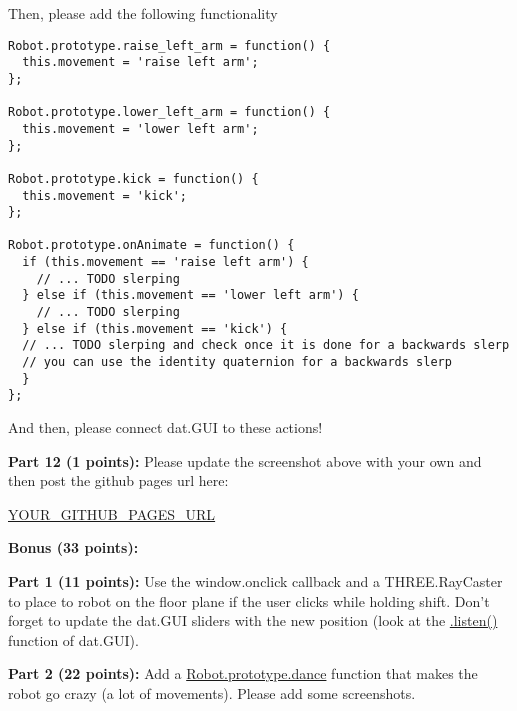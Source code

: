 \documentclass[10pt,oneside,onecolumn,letterpaper]{article}
\begin{document}
\noindent Then, please add the following functionality

\begin{verbatim}
Robot.prototype.raise_left_arm = function() {
  this.movement = 'raise left arm';
};

Robot.prototype.lower_left_arm = function() {
  this.movement = 'lower left arm';
};

Robot.prototype.kick = function() {
  this.movement = 'kick';
};

Robot.prototype.onAnimate = function() {
  if (this.movement == 'raise left arm') {
    // ... TODO slerping
  } else if (this.movement == 'lower left arm') {
    // ... TODO slerping
  } else if (this.movement == 'kick') {
  // ... TODO slerping and check once it is done for a backwards slerp
  // you can use the identity quaternion for a backwards slerp
  }
};
\end{verbatim}

\noindent And then, please connect dat.GUI to these actions!

\vspace{.5cm}

\noindent\textbf{Part 12 (1 points):} Please update the screenshot above with your own and then post the github pages url here:

\vspace{.5cm}

\url{YOUR_GITHUB_PAGES_URL}

\vspace{3cm}

\noindent\textbf{Bonus (33 points):}

\vspace{.5cm}

\noindent\textbf{Part 1 (11 points):} Use the window.onclick callback and a THREE.RayCaster to place to robot on the floor plane if the user clicks while holding shift. Don't forget to update the dat.GUI sliders with the new position (look at the \url{.listen()} function of dat.GUI).

\vspace{.5cm}

\noindent\textbf{Part 2 (22 points):} Add a \url{Robot.prototype.dance} function that makes the robot go crazy (a lot of movements). Please add some screenshots.
\end{document}
